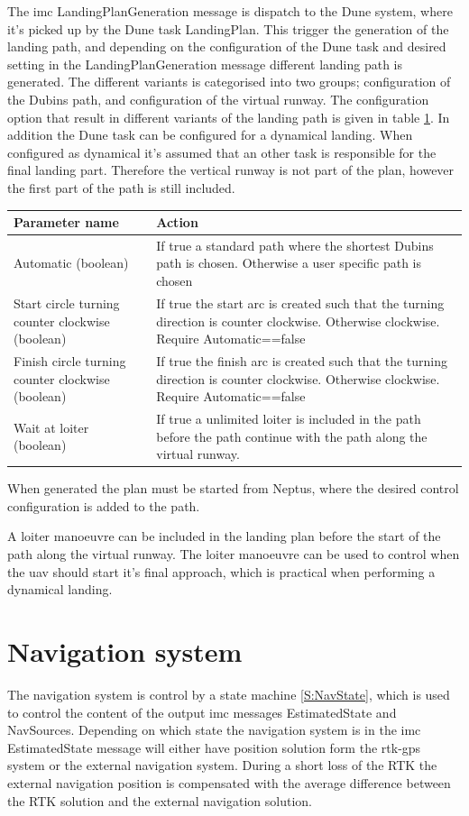 The \gls{imc} LandingPlanGeneration message is dispatch to the Dune system, where it's picked up by the Dune task LandingPlan. This trigger the generation of the landing path, and depending on the configuration of the Dune task and desired setting in the LandingPlanGeneration message different landing path is generated. The different variants is categorised into two groups; configuration of the Dubins path, and configuration of the virtual runway. The configuration option that result in different variants of the landing path is given in table \ref{Tb:DubinConfig}. In addition the Dune task can be configured for a dynamical landing. When configured as dynamical it's assumed that an other task is responsible for the final landing part. Therefore the vertical runway is not part of the plan, however the first part of the path is still included.
\begin{table}
\centering
\begin{tabular}{| p{2.7cm} | | p{6cm} |}
\hline
\textbf{Parameter name} 							& \textbf{Action} \\ \hline
 Automatic (boolean)								& If true a standard path where the shortest Dubins path is chosen. Otherwise a user specific path is chosen \\ \hline
Start circle turning counter clockwise (boolean)	& If true the start arc is created such that the turning direction is counter clockwise. Otherwise clockwise. Require Automatic==false \\ \hline
Finish circle turning counter clockwise (boolean)	& If true the finish arc is created such that the turning direction is counter clockwise. Otherwise clockwise. Require Automatic==false \\ \hline
Wait at loiter (boolean)							& If true a unlimited loiter is included in the path before the path continue with the path along the virtual runway. \\ \hline

\end{tabular}
\label{Tb:DubinConfig}
\end{table}
When generated the plan must be started from Neptus, where the desired control configuration is added to the path.

A loiter manoeuvre can be included in the landing plan before the start of the path along the virtual runway. The loiter manoeuvre can be used to control when the \gls{uav} should start it's final approach, which is practical when performing a dynamical landing.
\section{Navigation system}
The navigation system is control by a state machine \ref{S:NavState}, which is used to control the content of the output \gls{imc} messages EstimatedState and NavSources. Depending on which state the navigation system is in the \gls{imc} EstimatedState message will either have position solution form the \gls{rtk-gps} system or the external navigation system. During a short loss of the RTK the external navigation position is compensated with the average difference between the RTK solution and the external navigation solution.
